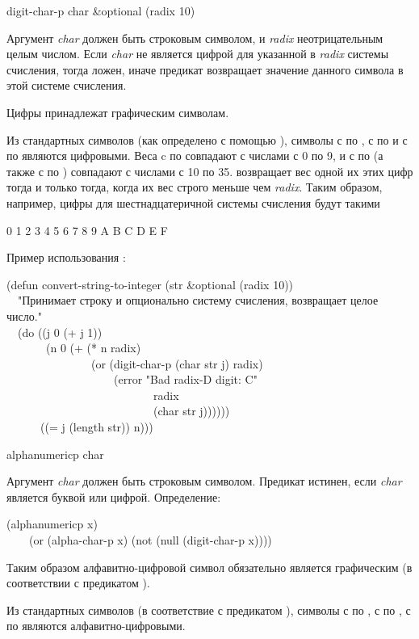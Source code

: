 \begin{defun}[Функция]
digit-char-p char &optional (radix 10)

Аргумент \emph{char} должен быть строковым символом, и \emph{radix}
неотрицательным целым числом.
Если \emph{char} не является цифрой для указанной в \emph{radix} системы
счисления, тогда  ложен, иначе предикат возвращает значение
данного символа в этой системе счисления.

Цифры принадлежат графическим символам.

Из стандартных символов (как определено с помощью ),
символы с  по , с  по  и с  по  являются
цифровыми. Веса c  по  совпадают с числами с 0 по 9, и с  по
 (а также с  по ) совпадают с числами с 10 по 35.
 возвращает вес одной их этих цифр тогда и только тогда, когда
их вес строго меньше чем \emph{radix}. Таким образом, например, цифры для
шестнадцатеричной системы счисления будут такими
\begin{lisp}
0  1  2  3  4  5  6  7  8  9  A  B  C  D  E  F
\end{lisp}

Пример использования :
\begin{lisp}
(defun convert-string-to-integer (str \&optional (radix 10)) \\
~~"Принимает строку и опционально систему счисления, возвращает целое число." \\
~~(do ((j 0 (+ j 1)) \\
~~~~~~~(n 0 (+ (* n radix) \\
~~~~~~~~~~~~~~~(or (digit-char-p (char str j) radix) \\
~~~~~~~~~~~~~~~~~~~(error "Bad radix-{\Xtilde}D digit: {\Xtilde}C" \\
~~~~~~~~~~~~~~~~~~~~~~~~~~radix \\
~~~~~~~~~~~~~~~~~~~~~~~~~~(char str j)))))) \\
~~~~~~((= j (length str)) n)))
\end{lisp}
\end{defun}

\begin{defun}[Функция]
alphanumericp char

Аргумент \emph{char} должен быть строковым символом.
Предикат  истинен, если \emph{char} является буквой или
цифрой. Определение:
\begin{lisp}
(alphanumericp x) \\
~~~\EQ\ (or (alpha-char-p x) (not (null (digit-char-p x))))
\end{lisp}
Таким образом алфавитно-цифровой символ обязательно является графическим (в
соответствии с предикатом ).

Из стандартных символов (в соответствие с предикатом ),
символы с  по , с  по , с  по  являются
алфавитно-цифровыми.
\end{defun}

